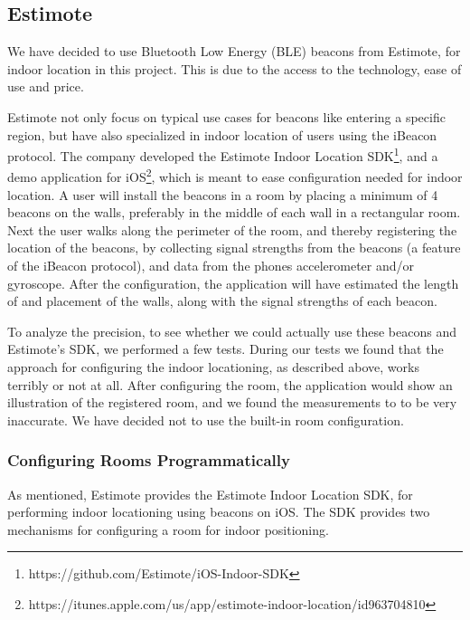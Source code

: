 \subsection{Estimote}
We have decided to use Bluetooth Low Energy (BLE) beacons from Estimote, 
for indoor location in this project. 
This is due to the access to the technology, ease of use and price. 

Estimote not only focus on typical use cases for beacons like entering a specific region, 
but have also specialized in indoor location of users using the iBeacon protocol. 
The company developed the Estimote Indoor Location SDK\footnote{https://github.com/Estimote/iOS-Indoor-SDK}, 
and a demo application for iOS\footnote{https://itunes.apple.com/us/app/estimote-indoor-location/id963704810}, 
which is meant to ease configuration needed for indoor location. 
A user will install the beacons in a room by placing a minimum of \num{4} beacons on the walls, 
preferably in the middle of each wall in a rectangular room.   
Next the user walks along the perimeter of the room, 
and thereby registering the location of the beacons, 
by collecting signal strengths from the beacons (a feature of the iBeacon protocol), 
and data from the phones accelerometer and/or gyroscope.
After the configuration, the application will have estimated the length of and placement of the walls, 
along with the signal strengths of each beacon.

To analyze the precision, 
to see whether we could actually use these beacons and Estimote's SDK, 
we performed a few tests. 
During our tests we found that the approach for configuring the indoor locationing, 
as described above, works terribly or not at all. 
After configuring the room, 
the application would show an illustration of the registered room, 
and we found the measurements to to be very inaccurate.
We have decided not to use the built-in room configuration. 

\subsubsection{Configuring Rooms Programmatically}
As mentioned, Estimote provides the Estimote Indoor Location SDK, 
for performing indoor locationing using beacons on iOS. 
The SDK provides two mechanisms for configuring a room for indoor positioning.

